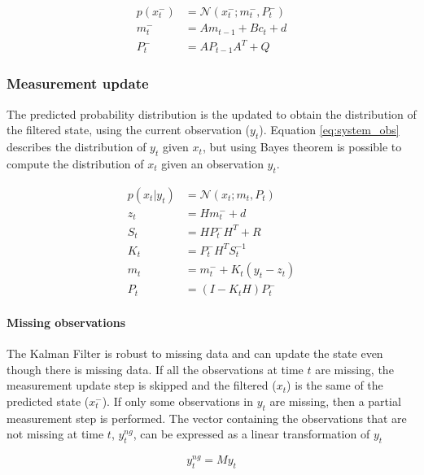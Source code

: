 \documentclass{article}
\newcommand{\norm}[3]{\mathcal{N}\left(#1; #2, #3\right)} %
\begin{document}
\begin{align}\label{eq:time_update}
    p(x^-_t) &= \norm{x_t^-}{m_t^-}{ P_t^-}\\
    m_t^- &= Am_{t-1} + B c_t + d \label{eq:time_update_mean}\\
    P_t^- &= AP_{t-1}A^T + Q \label{eq:time_update_cov}
\end{align} 

\subsubsection{Measurement update}

The predicted probability distribution is the updated to obtain the distribution of the filtered state, using the current observation ($y_t$). Equation \ref{eq:system_obs} describes the distribution of $y_t$ given $x_t$, but using Bayes theorem is possible to compute the distribution of $x_t$ given an observation $y_t$.

\begin{align}
 p(x_t|y_t) &= \mathcal{N}(x_t; m_t, P_t) \label{eq:meas_update}\\
 z_t &= Hm_t^- + d \label{eq:meas_update:obs_mean}\\
 S_t &= HP_t^-H^T + R \label{eq:meas_update:obs_cov}\\
 K_t &= P_t^-H^TS_t^{-1} \label{eq:meas_update:kalman_gain}\\
 m_t &= m_t^- + K_t(y_t - z_t) \label{eq:meas_update:state_mean}\\
 P_t &= (I-K_tH)P_t^- \label{eq:meas_update:state_cov}
\end{align}
    
\paragraph{Missing observations}

The Kalman Filter is robust to missing data and can update the state even though there is missing data. 
If all the observations at time $t$ are missing, the measurement update step is skipped and the filtered ($x_t$) is the same of the predicted state ($x_t^-$). If only some observations in $y_t$ are missing, then a partial measurement step is performed.
The vector containing the observations that are not missing at time $t$, $y^{ng}_t$, can be expressed as a linear transformation of $y_t$

\begin{equation}\label{eq:miss_obs}
    y^{ng}_t = My_t
\end{equation}
\end{document}

